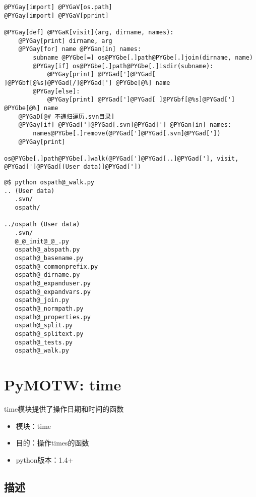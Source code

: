 \documentclass[a4paper,10pt,english]{manual}
\begin{document}
\begin{Verbatim}[commandchars=@\[\]]
@PYGay[import] @PYGaV[os.path]
@PYGay[import] @PYGaV[pprint]

@PYGay[def] @PYGaK[visit](arg, dirname, names):
    @PYGay[print] dirname, arg
    @PYGay[for] name @PYGan[in] names:
        subname @PYGbe[=] os@PYGbe[.]path@PYGbe[.]join(dirname, name)
        @PYGay[if] os@PYGbe[.]path@PYGbe[.]isdir(subname):
            @PYGay[print] @PYGad[']@PYGad[ ]@PYGbf[@%s]@PYGad[/]@PYGad['] @PYGbe[@%] name
        @PYGay[else]:
            @PYGay[print] @PYGad[']@PYGad[ ]@PYGbf[@%s]@PYGad['] @PYGbe[@%] name
    @PYGaD[@# 不递归遍历.svn目录]
    @PYGay[if] @PYGad[']@PYGad[.svn]@PYGad['] @PYGan[in] names:
        names@PYGbe[.]remove(@PYGad[']@PYGad[.svn]@PYGad['])
    @PYGay[print]

os@PYGbe[.]path@PYGbe[.]walk(@PYGad[']@PYGad[..]@PYGad['], visit, @PYGad[']@PYGad[(User data)]@PYGad['])
\end{Verbatim}

\begin{Verbatim}[commandchars=@\[\]]
@$ python ospath@_walk.py
.. (User data)
   .svn/
   ospath/

../ospath (User data)
   .svn/
   @_@_init@_@_.py
   ospath@_abspath.py
   ospath@_basename.py
   ospath@_commonprefix.py
   ospath@_dirname.py
   ospath@_expanduser.py
   ospath@_expandvars.py
   ospath@_join.py
   ospath@_normpath.py
   ospath@_properties.py
   ospath@_split.py
   ospath@_splitext.py
   ospath@_tests.py
   ospath@_walk.py
\end{Verbatim}

\resetcurrentobjects

\clearpage
\section{PyMOTW: time}

time模块提供了操作日期和时间的函数
\begin{itemize}
\item {} 
模块：time

\item {} 
目的：操作times的函数

\item {} 
python版本：1.4+

\end{itemize}


\subsection{描述}
\end{document}
